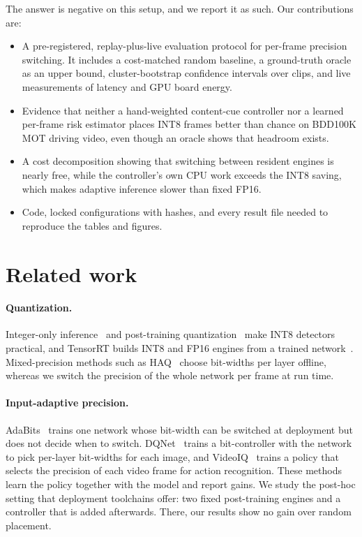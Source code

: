 \documentclass[pdflatex,sn-mathphys-num]{sn-jnl}
\begin{document}
The answer is negative on this setup, and we report it as such. Our contributions are:
\begin{itemize}
\item A pre-registered, replay-plus-live evaluation protocol for per-frame precision switching. It includes a cost-matched random baseline, a ground-truth oracle as an upper bound, cluster-bootstrap confidence intervals over clips, and live measurements of latency and GPU board energy.
\item Evidence that neither a hand-weighted content-cue controller nor a learned per-frame risk estimator places INT8 frames better than chance on BDD100K MOT driving video, even though an oracle shows that headroom exists.
\item A cost decomposition showing that switching between resident engines is nearly free, while the controller's own CPU work exceeds the INT8 saving, which makes adaptive inference slower than fixed FP16.
\item Code, locked configurations with hashes, and every result file needed to reproduce the tables and figures.
\end{itemize}

\section{Related work}\label{sec:related}

\paragraph{Quantization.} Integer-only inference~\cite{jacob2018quantization} and post-training quantization~\cite{nagel2021whitepaper} make INT8 detectors practical, and TensorRT builds INT8 and FP16 engines from a trained network~\cite{nvidia_tensorrt_docs}. Mixed-precision methods such as HAQ~\cite{wang2019haq} choose bit-widths per layer offline, whereas we switch the precision of the whole network per frame at run time.

\paragraph{Input-adaptive precision.} AdaBits~\cite{jin2020adabits} trains one network whose bit-width can be switched at deployment but does not decide when to switch. DQNet~\cite{liu2022dqnet} trains a bit-controller with the network to pick per-layer bit-widths for each image, and VideoIQ~\cite{sun2021videoiq} trains a policy that selects the precision of each video frame for action recognition. These methods learn the policy together with the model and report gains. We study the post-hoc setting that deployment toolchains offer: two fixed post-training engines and a controller that is added afterwards. There, our results show no gain over random placement.
\end{document}
